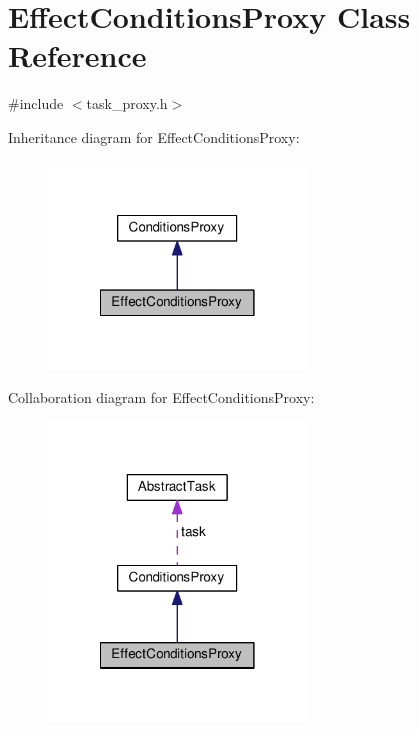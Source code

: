 \hypertarget{classEffectConditionsProxy}{\section{Effect\-Conditions\-Proxy Class Reference}
\label{classEffectConditionsProxy}
}


{\ttfamily \#include $<$task\-\_\-proxy.\-h$>$}



Inheritance diagram for Effect\-Conditions\-Proxy\-:
\nopagebreak
\begin{figure}[H]
\begin{center}
\leavevmode
\includegraphics[width=194pt]{classEffectConditionsProxy__inherit__graph}
\end{center}
\end{figure}


Collaboration diagram for Effect\-Conditions\-Proxy\-:
\nopagebreak
\begin{figure}[H]
\begin{center}
\leavevmode
\includegraphics[width=194pt]{classEffectConditionsProxy__coll__graph}
\end{center}
\end{figure}
